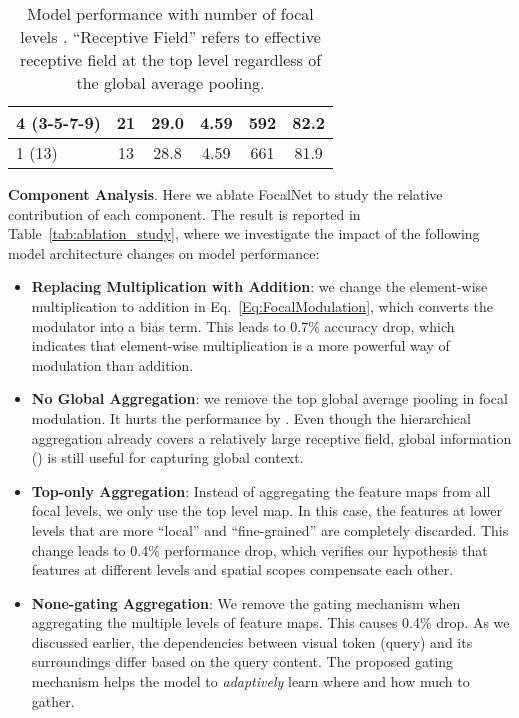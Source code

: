 \documentclass{article}
\begin{document}
\begin{table}[t]
\begin{minipage}{0.45\linewidth}
{\begin{tabular}{l|ccccc}
        4 (3-5-7-9) & 21 & 29.0 & 4.59  & 592  & 82.2   \\
        \midrule
        1 (13)      & 13 & 28.8 & 4.59  & 661 & 81.9   \\
        \bottomrule
    \end{tabular}
    }
    \captionsetup{font=footnotesize}    
    \caption{Model performance with number of focal levels . ``Receptive Field'' refers to effective receptive field at the top level regardless of the global average pooling.}
    \label{tab:aggregation_level}    
    \vspace{-4mm}
\end{minipage}
\vspace{-3mm}
\end{table}



\textbf{Component Analysis}. Here we ablate FocalNet to study the relative contribution of each component. The result is reported in Table~\ref{tab:ablation_study}, where we investigate the impact of the following model architecture changes on model performance:
\begin{itemize}[leftmargin=*]
    \item \textbf{Replacing Multiplication with Addition}: we change the element-wise multiplication to addition in Eq.~\eqref{Eq:FocalModulation}, which converts the modulator into a bias term. This leads to 0.7\% accuracy drop, which indicates that element-wise multiplication is a more powerful way of modulation than addition.
    \item \textbf{No Global Aggregation}: we remove the top global average pooling in focal modulation. It hurts the performance by . Even though the hierarchical aggregation already covers a relatively large receptive field, global information () is still useful for capturing global context.
    \item \textbf{Top-only Aggregation}: Instead of aggregating the feature maps from all focal levels, we only use the top level map. In this case, the features at lower levels that are more ``local'' and ``fine-grained'' are completely discarded. This change leads to 0.4\% performance drop, which verifies our hypothesis that features at different levels and spatial scopes compensate each other.\item \textbf{None-gating Aggregation}: We remove the gating mechanism when aggregating the multiple levels of feature maps. This causes 0.4\% drop. As we discussed earlier, the dependencies between visual token (query) and its surroundings differ based on the query content. The proposed gating mechanism helps the model to {\it adaptively} learn where and how much to gather.
\end{itemize}
\end{document}
